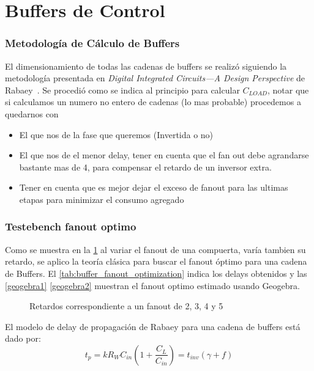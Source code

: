 \documentclass[12pt,a4paper]{report}
\begin{document}
\newpage
\section{Buffers de Control}

\subsubsection{Metodología de Cálculo de Buffers}

El dimensionamiento de todas las cadenas de buffers se realizó siguiendo la metodología presentada en \textit{Digital Integrated Circuits—A Design Perspective} de Rabaey~\cite{rabaey}. Se procedió como se indica al principio para calcular $C_{LOAD}$, notar que si calculamos un numero no entero de cadenas (lo mas probable) procedemos a quedarnos con 
\begin{itemize}
    \item El que nos de la fase que queremos (Invertida o no)
    \item El que nos de el menor delay, tener en cuenta que el fan out debe agrandarse bastante mas de 4, para compensar el retardo de un inversor extra.
    \item Tener en cuenta que es mejor dejar el exceso de fanout para las ultimas etapas para minimizar el consumo agregado
\end{itemize}


\subsubsection{Testebench fanout optimo}
Como se muestra en la \cref{bufretardos} al variar el fanout de una compuerta, varía tambien su retardo, se aplico la teoría clásica para buscar el fanout óptimo para una cadena de Buffers. El \cref{tab:buffer_fanout_optimization} indica los delays obtenidos y las \cref{geogebra1} \cref{geogebra2} muestran el fanout optimo estimado usando Geogebra.

\begin{figure}[H]
    \centering
    
    \caption{Retardos correspondiente a un fanout de 2, 3, 4 y 5}
        \label{bufretardos}
\end{figure}
El modelo de delay de propagación de Rabaey para una cadena de buffers está dado por:
\begin{equation}
t_p = k R_W C_{in} \left( 1 + \frac{C_L}{C_{in}} \right) = t_{inv} \left( \gamma + f \right)
\label{eq:rabaey_delay_model}
\end{equation}
\end{document}
